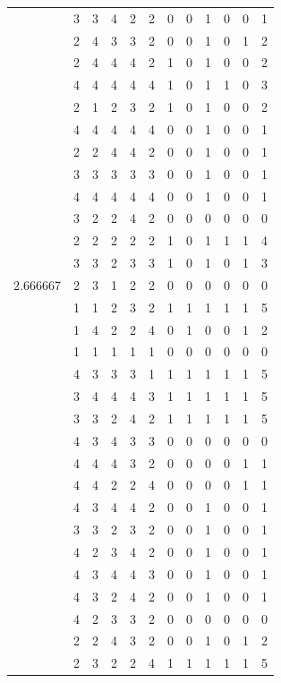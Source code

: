 \documentclass[]{book}
\theoremstyle{definition}
\theoremstyle{definition}
\theoremstyle{definition}
\theoremstyle{remark}
\begin{document}
\begin{table}
{\begin{tabular}[t]{rrrrrrrrrrrr}
 & 3 & 3 & 4 & 2 & 2 & 0 & 0 & 1 & 0 & 0 & 1\\
 & 2 & 4 & 3 & 3 & 2 & 0 & 0 & 1 & 0 & 1 & 2\\
 & 2 & 4 & 4 & 4 & 2 & 1 & 0 & 1 & 0 & 0 & 2\\
 & 4 & 4 & 4 & 4 & 4 & 1 & 0 & 1 & 1 & 0 & 3\\
 & 2 & 1 & 2 & 3 & 2 & 1 & 0 & 1 & 0 & 0 & 2\\
 & 4 & 4 & 4 & 4 & 4 & 0 & 0 & 1 & 0 & 0 & 1\\
 & 2 & 2 & 4 & 4 & 2 & 0 & 0 & 1 & 0 & 0 & 1\\
 & 3 & 3 & 3 & 3 & 3 & 0 & 0 & 1 & 0 & 0 & 1\\
 & 4 & 4 & 4 & 4 & 4 & 0 & 0 & 1 & 0 & 0 & 1\\
 & 3 & 2 & 2 & 4 & 2 & 0 & 0 & 0 & 0 & 0 & 0\\
 & 2 & 2 & 2 & 2 & 2 & 1 & 0 & 1 & 1 & 1 & 4\\
 & 3 & 3 & 2 & 3 & 3 & 1 & 0 & 1 & 0 & 1 & 3\\
2.666667 & 2 & 3 & 1 & 2 & 2 & 0 & 0 & 0 & 0 & 0 & 0\\
 & 1 & 1 & 2 & 3 & 2 & 1 & 1 & 1 & 1 & 1 & 5\\
 & 1 & 4 & 2 & 2 & 4 & 0 & 1 & 0 & 0 & 1 & 2\\
 & 1 & 1 & 1 & 1 & 1 & 0 & 0 & 0 & 0 & 0 & 0\\
 & 4 & 3 & 3 & 3 & 1 & 1 & 1 & 1 & 1 & 1 & 5\\
 & 3 & 4 & 4 & 4 & 3 & 1 & 1 & 1 & 1 & 1 & 5\\
 & 3 & 3 & 2 & 4 & 2 & 1 & 1 & 1 & 1 & 1 & 5\\
 & 4 & 3 & 4 & 3 & 3 & 0 & 0 & 0 & 0 & 0 & 0\\
 & 4 & 4 & 4 & 3 & 2 & 0 & 0 & 0 & 0 & 1 & 1\\
 & 4 & 4 & 2 & 2 & 4 & 0 & 0 & 0 & 0 & 1 & 1\\
 & 4 & 3 & 4 & 4 & 2 & 0 & 0 & 1 & 0 & 0 & 1\\
 & 3 & 3 & 2 & 3 & 2 & 0 & 0 & 1 & 0 & 0 & 1\\
 & 4 & 2 & 3 & 4 & 2 & 0 & 0 & 1 & 0 & 0 & 1\\
 & 4 & 3 & 4 & 4 & 3 & 0 & 0 & 1 & 0 & 0 & 1\\
 & 4 & 3 & 2 & 4 & 2 & 0 & 0 & 1 & 0 & 0 & 1\\
 & 4 & 2 & 3 & 3 & 2 & 0 & 0 & 0 & 0 & 0 & 0\\
 & 2 & 2 & 4 & 3 & 2 & 0 & 0 & 1 & 0 & 1 & 2\\
 & 2 & 3 & 2 & 2 & 4 & 1 & 1 & 1 & 1 & 1 & 5\\

\end{tabular}}
\end{table}
\end{document}
